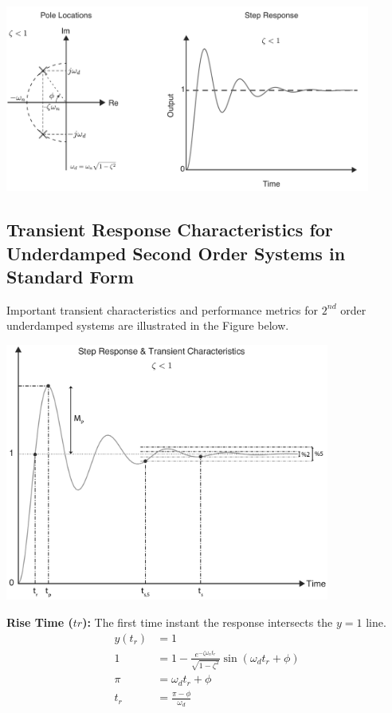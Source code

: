 \documentclass[twoside]{article}
\begin{document}
    \begin{minipage}[h]{1\linewidth}
    \begin{center}
     \includegraphics[width=0.9\textwidth]{under}
    \end{center}
  \end{minipage}
  
%
\subsection{Transient Response Characteristics for Underdamped Second Order Systems in Standard Form}

Important transient characteristics and performance metrics for $2^{nd}$ order underdamped systems are 
illustrated in the Figure below.

    \begin{minipage}[h]{1\linewidth}
    \begin{center}
     \includegraphics[width=0.8\textwidth]{transient}
    \end{center}
  \end{minipage}
  
\textbf{Rise Time ($tr$):}  The first time instant the response intersects the $y =1$ line.
%
 \begin{align*}
 y(t_r) &= 1
 \\
 1 &= 1 - \frac{e^{- \zeta \omega_n t_r}}{ \sqrt{1 - \zeta^2} } \sin(\omega_d t_r + \phi) 
 \\
 \pi &= \omega_d t_r + \phi
 \\
 t_r &= \frac{\pi - \phi}{\omega_d}
\end{align*}
  
\end{document}
